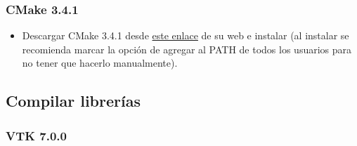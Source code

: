 \subsubsection{CMake 3.4.1}

\begin{itemize}
	\item Descargar CMake 3.4.1 desde \href{https://cmake.org/files/v3.4/cmake-3.4.1-win32-x86.exe}{este enlace} de su web e instalar (al instalar se recomienda marcar la opción de agregar al PATH de todos los usuarios para no tener que hacerlo manualmente).
\end{itemize}

\subsection{Compilar librerías}

\subsubsection{VTK 7.0.0}

